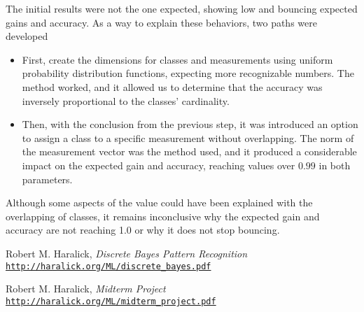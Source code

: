 \documentclass[letterpaper, conference]{IEEEtran}
\begin{document}
The initial results were not the one expected, showing low and bouncing expected gains and accuracy. As a way to explain these behaviors, two paths were developed

\begin{itemize}
  \item First, create the dimensions for classes and measurements using uniform probability distribution functions, expecting more recognizable numbers. The method worked, and it allowed us to determine that the accuracy was inversely proportional to the classes' cardinality.
  \item Then, with the conclusion from the previous step, it was introduced an option to assign a class to a specific measurement without overlapping. The norm of the measurement vector was the method used, and it produced a considerable impact on the expected gain and accuracy, reaching values over $0.99$ in both parameters.
\end{itemize}

Although some aspects of the value could have been explained with the overlapping of classes, it remains inconclusive why the expected gain and accuracy are not reaching 1.0 or why it does not stop bouncing.

\begin{thebibliography}{2}

Robert M. Haralick,
\textit{Discrete Bayes Pattern Recognition}
\\\texttt{\url{http://haralick.org/ML/discrete_bayes.pdf}}

Robert M. Haralick,
\textit{Midterm Project}
\\\texttt{\url{http://haralick.org/ML/midterm_project.pdf}}

\end{thebibliography}
\end{document}
